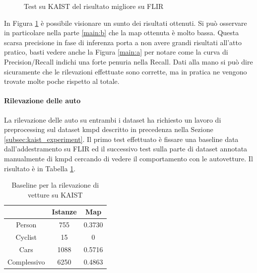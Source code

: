 \begin{figure}
\begin{minipage}{.5\linewidth}
{            }
    \end{minipage}
    \centering
    \caption{Test su KAIST del risultato migliore su FLIR}
    \label{fig:main}
\end{figure}

In Figura \ref{fig:main} è possibile visionare un sunto dei risultati ottenuti. Si può osservare in particolare nella parte \ref{main:b} che la \ac{map} ottenuta è molto bassa. Questa scarsa precisione in fase di inferenza porta a non avere grandi risultati all'atto pratico, basti vedere anche la Figura \ref{main:a} per notare come la curva di Precision/Recall indichi una forte penuria nella Recall. 
Dati alla mano si può dire sicuramente che le rilevazioni effettuate sono corrette, ma in pratica ne vengono trovate molte poche rispetto al totale. 

\paragraph{Rilevazione delle auto} %
La rilevazione delle auto su entrambi i dataset ha richiesto un lavoro di preprocessing sul dataset \ac{kmpd} descritto in precedenza nella Sezione \ref{subsec:kaist_experiment}.
Il primo test effettuato è fissare una baseline data dall'addestramento su FLIR ed il successivo test sulla parte di dataset annotata manualmente di \ac{kmpd} cercando di vedere il comportamento con le autovetture. Il risultato è in Tabella \ref{table:baseline_car_kaist}. 
\begin{table}[]
    \centering
    \begin{tabular}{c|c|c|}
    \cline{2-3}
     & Istanze & Map \\ \hline
    \multicolumn{1}{|c|}{Person} & 755 & 0.3730 \\ \hline
    \multicolumn{1}{|c|}{Cyclist} & 15 & 0 \\ \hline
    \multicolumn{1}{|c|}{Cars} & 1088 & 0.5716 \\ \hline
    \multicolumn{1}{|c|}{Complessivo} & 6250 & 0.4863 \\ \hline
    \end{tabular}
    \caption{Baseline per la rilevazione di vetture su KAIST}
    \label{table:baseline_car_kaist}
\end{table} 

